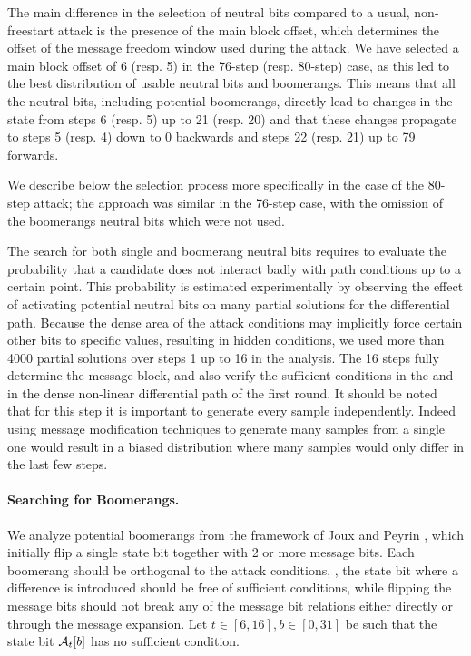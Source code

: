 The main difference in the selection of neutral bits compared to a usual, non-freestart attack is the presence of the main block offset, which
determines the offset of the message freedom window used during the attack.
We have selected a main block offset of 6 (resp. 5) in the 76-step (resp. 80-step) case, as this led to the best distribution of usable neutral bits and boomerangs.
This means that all the neutral bits, including potential boomerangs, directly lead to changes in the state from steps 6 (resp. 5) up to 21 (resp. 20) and that these changes propagate to steps 5 (resp. 4) down to 0 backwards and steps
22 (resp. 21) up to 79 forwards.

We describe below the selection process more specifically in the case of the 80-step attack; the approach was similar in the 76-step case, with the omission of the boomerangs neutral bits which were not used.

\medskip

The search for both single and boomerang neutral bits requires to evaluate the probability that a candidate does not interact badly with path conditions up to a certain point.
This probability is estimated experimentally by observing the effect of activating potential neutral bits on many partial solutions for the differential path.
Because the dense area of the attack conditions may implicitly force certain other bits to specific values, resulting in hidden conditions,
we used more than 4000 partial solutions over steps 1 up to 16 in the analysis.
The 16 steps fully determine the message block, and also verify the sufficient conditions in the \iv and in the dense non-linear differential path of the first round.
It should be noted that for this step it is important to generate every sample independently.
Indeed using \eg{} message modification techniques to generate many samples from a single one would result in a biased distribution where many samples would only differ in the last few steps.

\paragraph{Searching for Boomerangs.}
We analyze potential boomerangs from the framework of Joux and Peyrin \cite{DBLP:conf/crypto/JouxP07}, which initially flip a single state bit together with 2 or more message bits.
Each boomerang should be orthogonal to the attack conditions, \ie, the state bit where a difference is introduced
should be free of sufficient conditions, while flipping the message bits should not break any of the message bit relations
either directly or through the message expansion.
Let $t\in[6,16], b\in[0,31]$ be such that the state bit $\mathcal{A}_t[b]$ has no sufficient condition.

